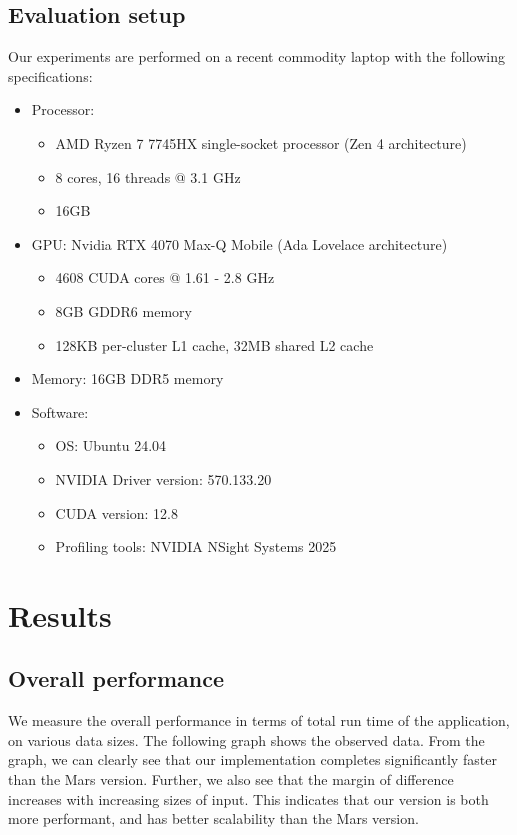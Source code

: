 \documentclass{article}
\begin{document}
\subsection{Evaluation setup}
Our experiments are performed on a recent commodity laptop with the following specifications:
\begin{itemize}
    \item Processor: 
    \begin{itemize}
       \item AMD Ryzen 7 7745HX single-socket processor (Zen 4 architecture)
       \item 8 cores, 16 threads @ 3.1 GHz
       \item 16GB
    \end{itemize}
    \item GPU: Nvidia RTX 4070 Max-Q Mobile (Ada Lovelace architecture)
    \begin{itemize}
        \item 4608 CUDA cores @ 1.61 - 2.8 GHz
        \item 8GB GDDR6 memory
        \item 128KB per-cluster L1 cache, 32MB shared L2 cache
    \end{itemize}
    \item Memory: 16GB DDR5 memory
    \item Software:
    \begin{itemize}
        \item OS: Ubuntu 24.04
        \item NVIDIA Driver version: 570.133.20
        \item CUDA version: 12.8
        \item Profiling tools: NVIDIA NSight Systems 2025
    \end{itemize}
\end{itemize}

\section{Results}
\subsection{Overall performance}
We measure the overall performance in terms of total run time of the application, on various data sizes. The following graph shows the observed data. From the graph, we can clearly see that our implementation completes significantly faster than the Mars version. Further, we also see that the margin of difference increases with increasing sizes of input. This indicates that our version is both more performant, and has better scalability than 
the Mars version.
\end{document}
